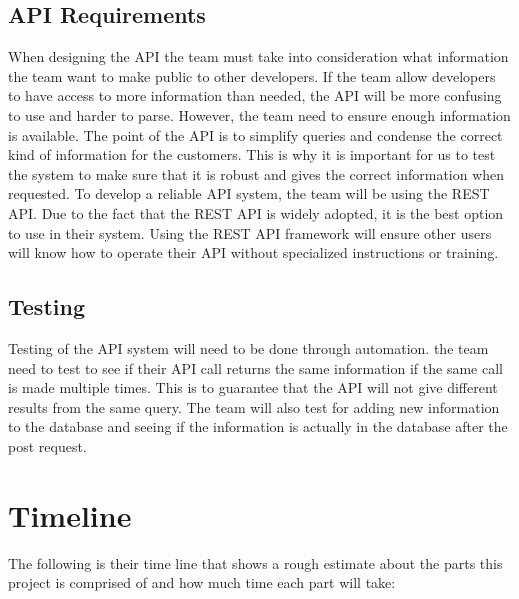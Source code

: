 \documentclass[onecolumn, draftclsnofoot,10pt, compsoc]{IEEEtran}
\begin{document}
\begin{singlespace}
    \subsection{API Requirements}
    When designing the API the team must take into consideration what information the team want to make public to other developers.
    If the team allow developers to have access to more information than needed, the API will be more confusing to use and harder to parse.
    However, the team need to ensure enough information is available.
    The point of the API is to simplify queries and condense the correct kind of information for the customers.
    This is why it is important for us to test the system to make sure that it is robust and gives the correct information when requested.
    To develop a reliable API system, the team will be using the REST API.
    Due to the fact that the REST API is widely adopted, it is the best option to use in their system.
    Using the REST API framework will ensure other users will know how to operate their API without specialized instructions or training.
    \subsection{Testing}
        Testing of the API system will need to be done through automation.
        the team need to test to see if their API call returns the same information if the same call is made multiple times.
        This is to guarantee that the API will not give different results from the same query.
        The team will also test for adding new information to the database and seeing if the information is actually in the database after the post request.
        
\section{Timeline}
The following is their time line that shows a rough estimate about the parts this project is comprised of and how much time each part will take:


\end{singlespace}
\end{document}
